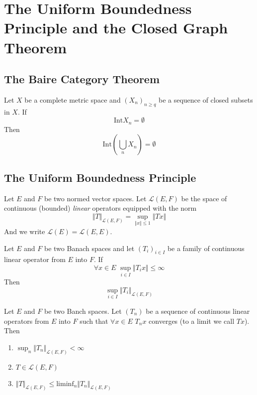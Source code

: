 \section{The Uniform Boundedness Principle and the Closed Graph Theorem}

\subsection{The Baire Category Theorem}

\begin{thm}[Baire]
	Let $X$ be a complete metric space and $ \left( X_n \right)_{n \geq q}$ be a sequence of closed subsets in $X$. If
	\[
	\mathrm{Int} X_n = \emptyset
	\]
	Then
	\[
		\mathrm{Int} \left( \bigcup_{n}X_n \right) = \emptyset
	\]
	
\end{thm}

\subsection{The Uniform Boundedness Principle}

\begin{defn}
	Let $E$ and $F$ be two normed vector spaces. Let $ \mathcal{L}(E,F)$ be the space of continuous (bounded) \textit{linear} operators equipped with the norm
	\[
		\Vert T \Vert_{ \mathcal{L}(E,F)} = \sup_{ \Vert x \Vert \leq 1} \Vert Tx \Vert
	\]
	And we write $ \mathcal{L}(E) = \mathcal{L}(E,E)$.
\end{defn}

\begin{thm}
	Let $E$ and $F$ be two Banach spaces and let $ \left( T_i \right)_{i \in I}$ be a family of continuous linear operator from $E$ into $F$. If
	\[
	\forall x \in E \hspace{4pt} \sup_{i \in I} \Vert T_i x \Vert \leq \infty
	\]
	Then
	\[
		\sup_{i \in I} \Vert T_i \Vert_{ \mathcal{L}(E,F)}
	\]
	
\end{thm}

\begin{cor}
	Let $E$ and $F$ be two Banch spaces. Let $ \left( T_n \right)$ be a sequence of continuous linear operators from $E$ into $F$ such that $ \forall x \in E \hspace{4pt} T_n x$ converges (to a limit we call $Tx$). Then
\begin{enumerate}
	\item $\sup_n \Vert T_n \Vert_{ \mathcal{L}(E,F)} < \infty$
	\item $ T \in \mathcal{L}(E,F)$
	\item $ \Vert T \Vert_{ \mathcal{L}(E,F)} \leq \mathrm{liminf}_n \Vert T_n \Vert_{ \mathcal{L}(E,F)}$
\end{enumerate}	
\end{cor}

